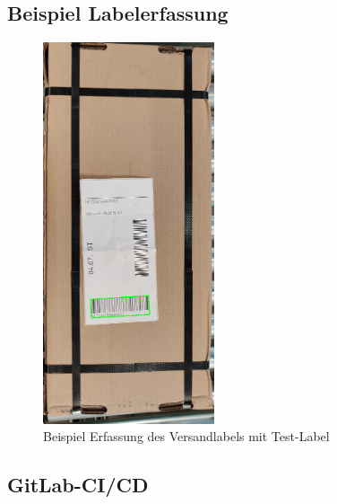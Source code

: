 \newpage
\subsection{Beispiel Labelerfassung}

\begin{figure}[htpb]
  \centering
  \includegraphics[width=0.45\textwidth]{./pics/foundLabel.png}
  \caption{Beispiel Erfassung des Versandlabels mit Test-Label}
  \label{appendix:fig:foundLabel}
\end{figure}


\newpage
\subsection{GitLab-CI/CD}


